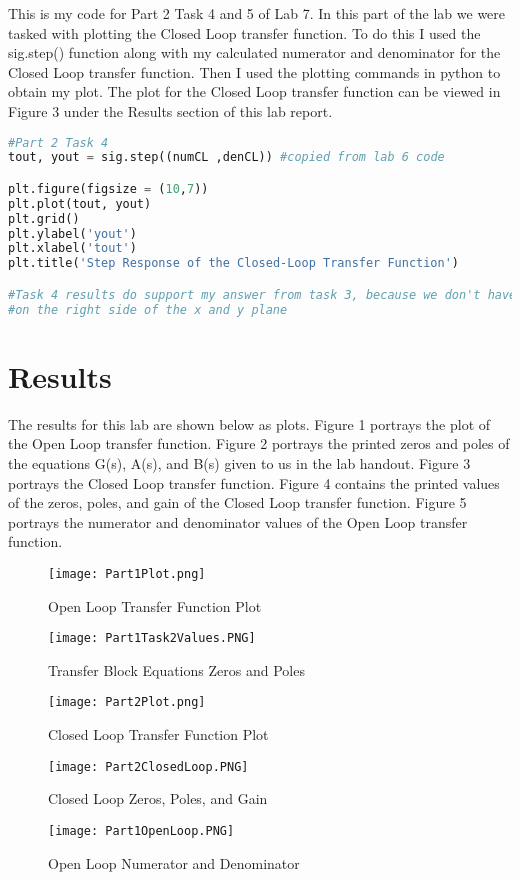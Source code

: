 \documentclass[12pt]{report}
\begin{document}
{This is my code for Part 2 Task 4 and 5 of Lab 7. In this part of the lab we were tasked with plotting the Closed Loop transfer function. To do this I used the sig.step() function along with my calculated numerator and denominator for the Closed Loop transfer function. Then I used the plotting commands in python to obtain my plot. The plot for the Closed Loop transfer function can be viewed in Figure 3 under the Results section of this lab report.  }
\begin{lstlisting}[language=Python]
#Part 2 Task 4
tout, yout = sig.step((numCL ,denCL)) #copied from lab 6 code

plt.figure(figsize = (10,7))
plt.plot(tout, yout)
plt.grid()
plt.ylabel('yout')
plt.xlabel('tout')
plt.title('Step Response of the Closed-Loop Transfer Function')

#Task 4 results do support my answer from task 3, because we don't have poles
#on the right side of the x and y plane

\end{lstlisting}




\section{Results}

The results for this lab are shown below as plots. Figure 1 portrays the plot of the Open Loop transfer function. Figure 2 portrays the printed zeros and poles of the equations G(s), A(s), and B(s) given to us in the lab handout. Figure 3 portrays the Closed Loop transfer function. Figure 4 contains the printed values of the zeros, poles, and gain of the Closed Loop transfer function. Figure 5 portrays the numerator and denominator values of the Open Loop transfer function.


\begin{figure}
\texttt{[image: Part1Plot.png]}
\caption{Open Loop Transfer Function Plot}
\end{figure}



\begin{figure}
\texttt{[image: Part1Task2Values.PNG]}
\caption{Transfer Block Equations Zeros and Poles }
\end{figure}
\newpage
\begin{figure}
\texttt{[image: Part2Plot.png]}
\caption{Closed Loop Transfer Function Plot}
\end{figure}
\newpage
\begin{figure}
\texttt{[image: Part2ClosedLoop.PNG]}
\caption{Closed Loop Zeros, Poles, and Gain}
\end{figure}
\newpage
\begin{figure}
\texttt{[image: Part1OpenLoop.PNG]}
\caption{Open Loop Numerator and Denominator}
\end{figure}
\end{document}

